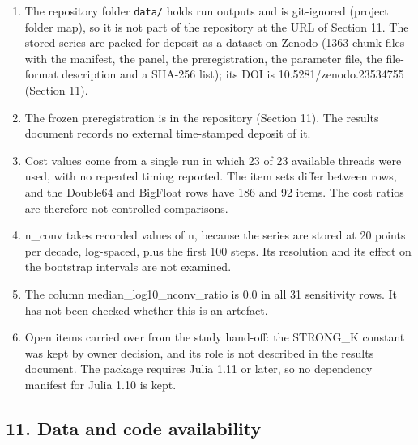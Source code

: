 \documentclass[
  11pt,
]{article}
\begin{document}
\begin{enumerate}
  study manifests record each commit separately and no single run record
  names both.
\item
  The repository folder \texttt{data/} holds run outputs and is
  git-ignored (project folder map), so it is not part of the repository
  at the URL of Section 11. The stored series are packed for deposit as
  a dataset on Zenodo (1363 chunk files with the manifest, the panel,
  the preregistration, the parameter file, the file-format description
  and a SHA-256 list); its DOI is 10.5281/zenodo.23534755 (Section 11).
\item
  The frozen preregistration is in the repository (Section 11). The
  results document records no external time-stamped deposit of it.
\item
  Cost values come from a single run in which 23 of 23 available threads
  were used, with no repeated timing reported. The item sets differ
  between rows, and the Double64 and BigFloat rows have 186 and 92
  items. The cost ratios are therefore not controlled comparisons.
\item
  n\_conv takes recorded values of n, because the series are stored at
  20 points per decade, log-spaced, plus the first 100 steps. Its
  resolution and its effect on the bootstrap intervals are not examined.
\item
  The column median\_log10\_nconv\_ratio is 0.0 in all 31 sensitivity
  rows. It has not been checked whether this is an artefact.
\item
  Open items carried over from the study hand-off: the STRONG\_K
  constant was kept by owner decision, and its role is not described in
  the results document. The package requires Julia 1.11 or later, so no
  dependency manifest for Julia 1.10 is kept.
\end{enumerate}

\subsection{11. Data and code
availability}\label{data-and-code-availability}
\end{document}
